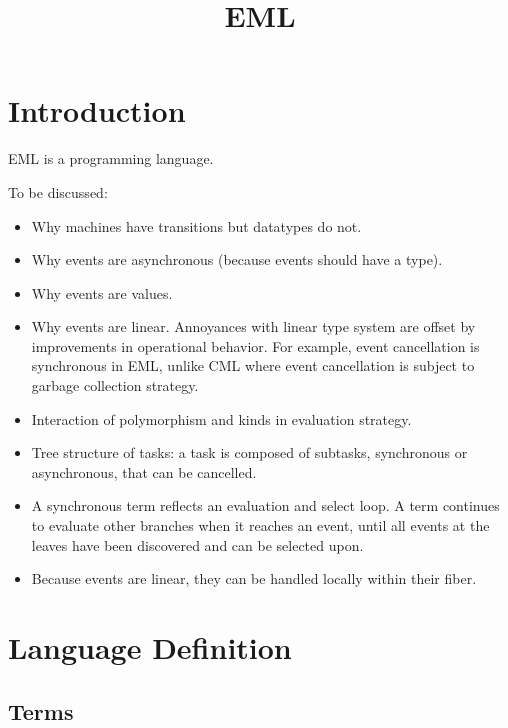 \documentclass[acmsmall]{acmart}
\begin{document}
\title[EML]{EML}
\maketitle

\section{Introduction}

EML is a programming language.

To be discussed:
\begin{itemize}
\item Why machines have transitions but datatypes do not.
\item Why events are asynchronous (because events should have a type).
\item Why events are values.
\item Why events are linear. Annoyances with linear type system are
  offset by improvements in operational behavior. For example, event
  cancellation is synchronous in EML, unlike CML where event
  cancellation is subject to garbage collection strategy.
\item Interaction of polymorphism and kinds in evaluation strategy.
\item Tree structure of tasks: a task is composed of subtasks,
  synchronous or asynchronous, that can be cancelled.
\item A synchronous term reflects an evaluation and select loop.  A
  term continues to evaluate other branches when it reaches an event,
  until all events at the leaves have been discovered and can be
  selected upon.
\item Because events are linear, they can be handled locally within
  their fiber.
\end{itemize}

\section{Language Definition}

\subsection{Terms}
\end{document}
